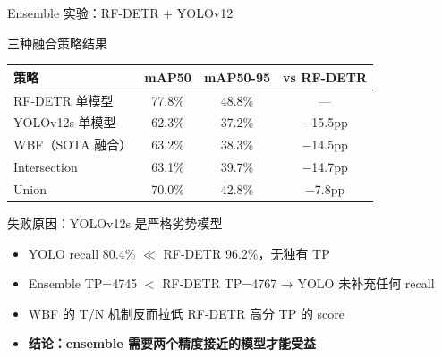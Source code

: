\documentclass[aspectratio=169, 10pt]{beamer}
\begin{document}
\begin{frame}{Ensemble 实验：RF-DETR + YOLOv12}
  \begin{block}{三种融合策略结果}
    \begin{tabular}{lccc}
      \toprule
      策略 & mAP50 & mAP50-95 & vs RF-DETR \\
      \midrule
      RF-DETR 单模型 & 77.8\% & 48.8\% & — \\
      YOLOv12s 单模型 & 62.3\% & 37.2\% & $-$15.5pp \\
      \midrule
      WBF（SOTA 融合） & 63.2\% & 38.3\% & $-$14.5pp \\
      Intersection & 63.1\% & 39.7\% & $-$14.7pp \\
      Union & 70.0\% & 42.8\% & $-$7.8pp \\
      \bottomrule
    \end{tabular}
  \end{block}
  \begin{alertblock}{失败原因：YOLOv12s 是严格劣势模型}
    \begin{itemize}
      \item YOLO recall 80.4\% $\ll$ RF-DETR 96.2\%，无独有 TP
      \item Ensemble TP=4745 $<$ RF-DETR TP=4767 → YOLO 未补充任何 recall
      \item WBF 的 T/N 机制反而拉低 RF-DETR 高分 TP 的 score
      \item \textbf{结论：ensemble 需要两个精度接近的模型才能受益}
    \end{itemize}
  \end{alertblock}
\end{frame}
\end{document}
